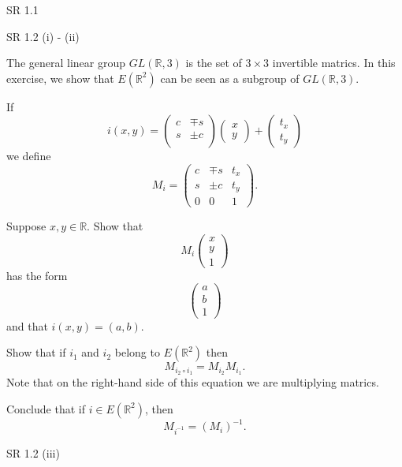 \documentclass[minion]{homework}
\newcommand{\Reals}{\mathbb{R}}
\begin{document}
\begin{aproblems}

\hproblem SR 1.1

\hproblem SR 1.2 (i) - (ii)

\hproblem The general linear group $GL(\Reals,3)$ is the set of $3\times 3$ invertible matrics.
In this exercise, we show that $E(\Reals^2)$ can be seen as a subgroup of $GL(\Reals,3)$.

If
\begin{equation}
i(x,y) = \begin{pmatrix} c & \mp s  \\
s & \pm c \\
\end{pmatrix} \begin{pmatrix} x \\ y \end{pmatrix} +\begin{pmatrix} t_x \\ t_y \end{pmatrix}
\end{equation}
we define
\begin{equation}
M_i = \begin{pmatrix} c & \mp s & t_x \\
s & \pm c & t_y \\
0 &  0 & 1\end{pmatrix}.
\end{equation}
\begin{subproblems}
\item Suppose $x,y\in \Reals$. Show that 
\begin{equation}
M_i \begin{pmatrix} x \\ y \\ 1 \end{pmatrix}
\end{equation}
has the form
\begin{equation}
\begin{pmatrix} a \\ b \\ 1 \end{pmatrix}
\end{equation}
and that $i(x,y)=(a,b)$.
\item Show that if $i_1$ and $i_2$ belong to $E(\Reals^2)$ then
\begin{equation}
M_{i_2\circ i_1} = M_{i_2} M_{i_1}.
\end{equation}
Note that on the right-hand side of this equation we are multiplying matrics.
\item  Conclude that if $i\in E(\Reals^2)$, then
\begin{equation}
M_{i^{-1}} = (M_i)^{-1}.
\end{equation}
\end{subproblems}

 SR 1.2 (iii)

\end{aproblems}
\end{document}
